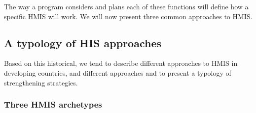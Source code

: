 The way a program considers and plans each of these functions will define how a specific HMIS will work. We will now present three common approaches to HMIS.


\subsection{A typology of HIS approaches}

Based on this historical, we tend to describe different approaches to HMIS in developing countries, and different approaches and to present a typology of strengthening strategies.

\subsubsection{Three HMIS archetypes}




